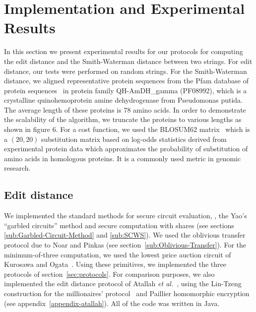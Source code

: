 \section{Implementation and Experimental Results}
\label{sec:genomics-experimental}

In this section we present experimental results for our protocols for
computing the edit distance and the Smith-Waterman distance between
two strings.  For edit distance, our tests were performed on random
strings.  For the Smith-Waterman distance, we aligned representative protein
sequences from the Pfam database of protein sequences~\cite{pfam2002}
in protein family {\sf QH-AmDH\_gamma (PF08992)}, which is a
crystalline quinohemoprotein amine dehydrogenase from Pseudomonas
putida.  The average length of these proteins is 78 amino acids.  In
order to demonstrate the scalability of the algorithm, we truncate the
proteins to various lengths as shown in figure 6.  For a cost
function, we used the BLOSUM62 matrix~\cite{blosum62} which is a
$(20,20)$ substitution matrix based on log-odds statistics derived
from experimental protein data which approximates the probability of
substitution of amino acids in homologous proteins.  It is a commonly
used metric in genomic research.

\subsection{Edit distance}


We implemented the standard methods for secure circuit evaluation,
\ie, the Yao's ``garbled circuits'' method and secure computation with
shares (see sections \ref{sub:Garbled-Circuit-Method} and \ref{sub:SCWS}).  We used the oblivious transfer
protocol due to Noar and Pinkas (see section~\ref{sub:Oblivious-Transfer}).  For the
minimum-of-three computation, we used the lowest price auction circuit of
Kurosawa and Ogata~\cite{KO02}.  Using these primitives, we implemented
the three protocols of section~\ref{sec:protocols}.  For comparison
purposes, we also implemented the edit distance protocol of Atallah
\textit{et al.}~\cite{atallah}, using the Lin-Tzeng construction for
the millionaires' protocol~\cite{lintzeng-acns05} and Paillier homomorphic
encryption~\cite{Paillier99} (see appendix~\ref{appendix-atallah}).
All of the code was written in Java.


